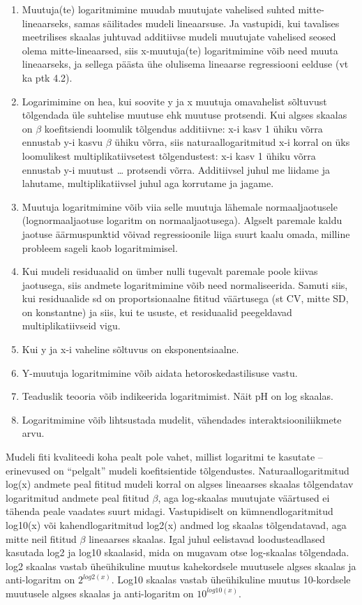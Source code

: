 \documentclass[]{book}
\begin{document}
\begin{enumerate}
\def\labelenumi{\arabic{enumi}.}
\item
  Muutuja(te) logaritmimine muudab muutujate vahelised suhted
  mitte-lineaarseks, samas säilitades mudeli lineaarsuse. Ja vastupidi,
  kui tavalises meetrilises skaalas juhtuvad additiivse mudeli muutujate
  vahelised seosed olema mitte-lineaarsed, siis x-muutuja(te)
  logaritmimine võib need muuta lineaarseks, ja sellega päästa ühe
  olulisema lineaarse regressiooni eelduse (vt ka ptk 4.2).
\item
  Logarimimine on hea, kui soovite y ja x muutuja omavahelist sõltuvust
  tõlgendada üle suhtelise muutuse ehk muutuse protsendi. Kui algses
  skaalas on \(\beta\) koefitsiendi loomulik tõlgendus additiivne: x-i
  kasv 1 ühiku võrra ennustab y-i kasvu \(\beta\) ühiku võrra, siis
  naturaallogaritmitud x-i korral on üks loomulikest
  multiplikatiivsetest tõlgendustest: x-i kasv 1 ühiku võrra ennustab
  y-i muutust \ldots{} protsendi võrra. Additiivsel juhul me liidame ja
  lahutame, multiplikatiivsel juhul aga korrutame ja jagame.
\item
  Muutuja logaritmimine võib viia selle muutuja lähemale
  normaaljaotusele (lognormaaljaotuse logaritm on normaaljaotusega).
  Algselt paremale kaldu jaotuse äärmuspunktid võivad regressioonile
  liiga suurt kaalu omada, milline probleem sageli kaob logaritmimisel.
\item
  Kui mudeli residuaalid on ümber nulli tugevalt paremale poole kiivas
  jaotusega, siis andmete logaritmimine võib need normaliseerida. Samuti
  siis, kui residuaalide sd on proportsionaalne fititud väärtusega (st
  CV, mitte SD, on konstantne) ja siis, kui te ususte, et residuaalid
  peegeldavad multiplikatiivseid vigu.
\item
  Kui y ja x-i vaheline sõltuvus on eksponentsiaalne.
\item
  Y-muutuja logaritmimine võib aidata hetoroskedastilisuse vastu.
\item
  Teaduslik teooria võib indikeerida logaritmimist. Näit pH on log
  skaalas.
\item
  Logaritmimine võib lihtsustada mudelit, vähendades
  interaktsiooniliikmete arvu.
\end{enumerate}

Mudeli fiti kvaliteedi koha pealt pole vahet, millist logaritmi te
kasutate -- erinevused on ``pelgalt'' mudeli koefitsientide
tõlgendustes. Naturaallogaritmitud log(x) andmete peal fititud mudeli
korral on algses lineaarses skaalas tõlgendatav logaritmitud andmete
peal fititud \(\beta\), aga log-skaalas muutujate väärtused ei tähenda
peale vaadates suurt midagi. Vastupidiselt on kümnendlogaritmitud
log10(x) või kahendlogaritmitud log2(x) andmed log skaalas
tõlgendatavad, aga mitte neil fititud \(\beta\) lineaarses skaalas. Igal
juhul eelistavad loodusteadlased kasutada log2 ja log10 skaalasid, mida
on mugavam otse log-skaalas tõlgendada. log2 skaalas vastab üheühikuline
muutus kahekordsele muutusele algses skaalas ja anti-logaritm on
\(2^{log2(x)}\). Log10 skaalas vastab üheühikuline muutus 10-kordsele
muutusele algses skaalas ja anti-logaritm on \(10^{log10(x)}\).
\end{document}
